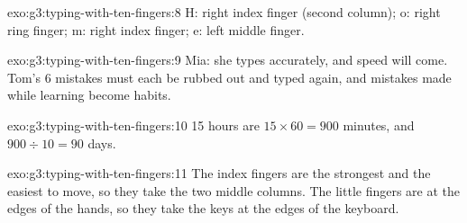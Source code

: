 \begin{solution}{exo:g3:typing-with-ten-fingers:8}
H: right index finger (second column); o: right ring finger; m: right index
finger; e: left middle finger.
\end{solution}

\begin{solution}{exo:g3:typing-with-ten-fingers:9}
Mia: she types accurately, and speed will come. Tom's 6 mistakes must each be
rubbed out and typed again, and mistakes made while learning become habits.
\end{solution}

\begin{solution}{exo:g3:typing-with-ten-fingers:10}
15 hours are $15 \times 60 = 900$ minutes, and $900 \div 10 = 90$ days.
\end{solution}

\begin{solution}{exo:g3:typing-with-ten-fingers:11}
The index fingers are the strongest and the easiest to move, so they take the
two middle columns. The little fingers are at the edges of the hands, so they
take the keys at the edges of the keyboard.
\end{solution}
